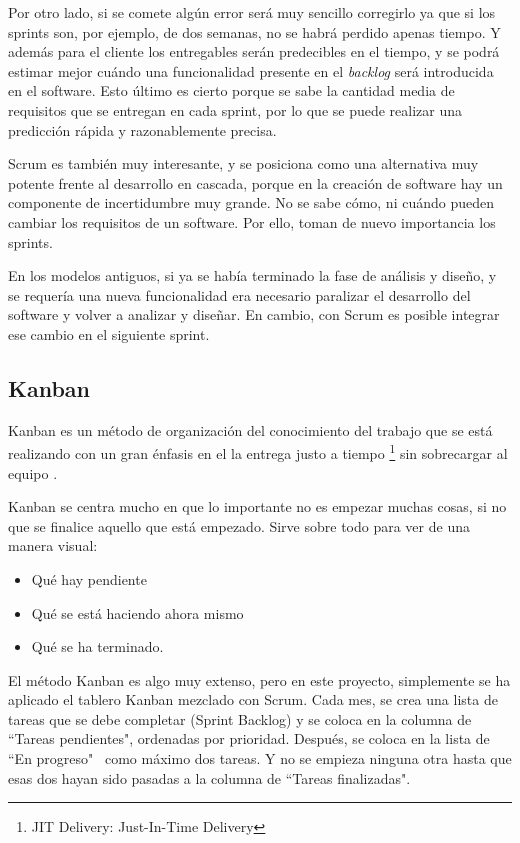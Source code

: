 Por otro lado, si se comete alg\'un error ser\'a muy sencillo corregirlo ya que si los sprints son, por ejemplo, de dos semanas, no 
se habr\'a perdido apenas tiempo. Y adem\'as para el cliente los entregables ser\'an predecibles en el tiempo, 
y se podr\'a estimar mejor cu\'ando una funcionalidad presente en el \emph{backlog}
ser\'a introducida en el software. Esto \'ultimo es cierto porque se sabe la cantidad media de requisitos que se
entregan en cada sprint, por lo que se puede realizar una predicci\'on r\'apida y razonablemente precisa.

Scrum es tambi\'en muy interesante, y se posiciona como una alternativa muy potente frente al
desarrollo en cascada, porque en la creaci\'on 
de software hay un componente de incertidumbre muy 
grande. No se sabe c\'omo, ni cu\'ando pueden cambiar los requisitos de un 
software. Por ello, toman de nuevo importancia los sprints. 

En los modelos antiguos, si ya se hab\'ia terminado la fase de an\'alisis y dise\~no, y se requer\'ia una nueva funcionalidad era necesario 
paralizar el desarrollo del software y volver a analizar y diseñar. En cambio, con Scrum es 
posible integrar ese cambio en el siguiente sprint.

\subsection{Kanban}
Kanban es un m\'etodo de organizaci\'on del conocimiento del trabajo que se est\'a realizando con un gran \'enfasis en el la entrega justo a 
tiempo \footnote{JIT Delivery: Just-In-Time Delivery} sin sobrecargar al equipo \cite{Kanban:WhatIsIt}.

Kanban se centra mucho en que lo importante no es empezar muchas cosas, si no que se finalice
aquello que est\'a empezado. Sirve sobre todo 
para ver de una manera visual:
\begin{itemize}
	\item Qu\'e hay pendiente
	\item Qu\'e se est\'a haciendo ahora mismo
	\item Qu\'e se ha terminado.
\end{itemize}

El m\'{e}todo Kanban es algo muy extenso, pero en este proyecto, simplemente se ha aplicado el tablero Kanban mezclado con Scrum. 
Cada mes, se crea una lista de tareas que se debe completar (Sprint Backlog) y se coloca en la columna de ``Tareas pendientes", 
ordenadas por prioridad. Despu\'es, se coloca en la lista de ``En progreso" \ como m\'{a}ximo dos tareas. Y no se empieza ninguna otra
hasta que esas dos hayan sido pasadas a la columna de ``Tareas finalizadas".

